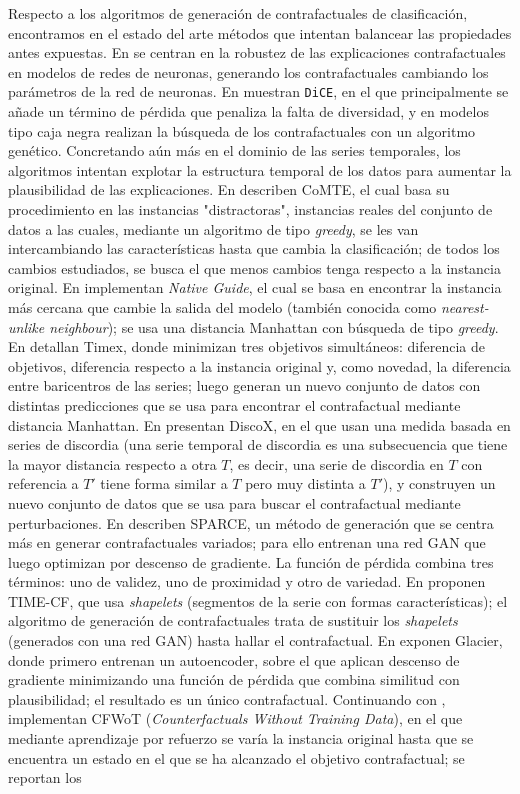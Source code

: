 \documentclass[12pt]{report} %
\begin{document}
Respecto a los algoritmos de generación de contrafactuales de clasificación, encontramos en el estado del arte
métodos que intentan balancear las propiedades antes expuestas. En \cite{Marzari2024} se centran en la robustez de las explicaciones contrafactuales en modelos de redes de neuronas, generando los contrafactuales cambiando los parámetros de la red de neuronas. En \cite{Mothilal2020} muestran \texttt{DiCE}, en el que principalmente se añade un término de pérdida que penaliza la falta de diversidad, y en modelos tipo caja negra realizan la búsqueda de los contrafactuales con un algoritmo genético.
Concretando aún más en el dominio de las series temporales, los algoritmos intentan explotar la estructura temporal de los datos para aumentar la plausibilidad de las explicaciones. En \cite{Ates2021} describen CoMTE, el cual basa su procedimiento en las instancias "distractoras", instancias reales del conjunto de datos a las cuales, mediante un algoritmo de tipo \textit{greedy}, se les van intercambiando las características hasta que cambia la clasificación; de todos los cambios estudiados, se busca el que menos cambios tenga respecto a la instancia original. En \cite{Delaney2021} implementan \textit{Native Guide}, el cual se basa en encontrar la instancia más cercana que cambie la salida del modelo (también conocida como \textit{nearest-unlike neighbour}); se usa una distancia Manhattan con búsqueda de tipo \textit{greedy}. En \cite{Filali2022} detallan Timex, donde minimizan tres objetivos simultáneos: diferencia de objetivos, diferencia respecto a la instancia original y, como novedad, la diferencia entre baricentros de las series; luego generan un nuevo conjunto de datos con distintas predicciones que se usa para encontrar el contrafactual mediante distancia Manhattan. En \cite{Bahri2024} presentan DiscoX, en el que usan una medida basada en series de discordia (una serie temporal de discordia es una subsecuencia que tiene la mayor distancia respecto a otra $T$, es decir, una serie de discordia en $T$ con referencia a $T'$ tiene forma similar a $T$ pero muy distinta a $T'$), y construyen un nuevo conjunto de datos que se usa para buscar el contrafactual mediante perturbaciones. En \cite{Lang2023} describen SPARCE, un método de generación que se centra más en generar contrafactuales variados; para ello entrenan una red GAN que luego optimizan por descenso de gradiente. La función de pérdida combina tres términos: uno de validez, uno de proximidad y otro de variedad. En \cite{Qi2024} proponen TIME-CF, que usa \textit{shapelets} (segmentos de la serie con formas características); el algoritmo de generación de contrafactuales trata de sustituir los \textit{shapelets} (generados con una red GAN) hasta hallar el contrafactual. En \cite{Wang2024} exponen Glacier, donde primero entrenan un autoencoder, sobre el que aplican descenso de gradiente minimizando una función de pérdida que combina similitud con plausibilidad; el resultado es un único contrafactual. Continuando con \cite{Xiangyu2025}, implementan CFWoT (\textit{Counterfactuals Without Training Data}), en el que mediante aprendizaje por refuerzo se varía la instancia original hasta que se encuentra un estado en el que se ha alcanzado el objetivo contrafactual; se reportan los 
\end{document}
